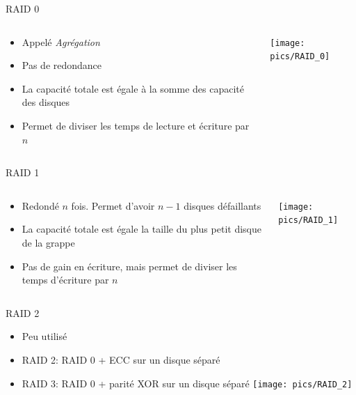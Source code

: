 \begin{frame}[fragile=singleslide]{RAID 0}
  \begin{columns}
    \begin{column}{6cm}
      \begin{itemize}
      \item Appelé \emph{Agrégation}
      \item Pas de redondance
      \item La capacité  totale est égale à la  somme des capacité des
        disques
      \item Permet de diviser les temps de lecture et écriture par $n$
      \end{itemize}
    \end{column}
    \begin{column}{4cm}
      \texttt{[image: pics/RAID\_0]}
    \end{column}
  \end{columns}
\end{frame}

\begin{frame}[fragile=singleslide]{RAID 1}
  \begin{columns}
    \begin{column}{6cm}
      \begin{itemize}
      \item Redondé $n$ fois. Permet d'avoir $n-1$ disques défaillants
      \item  La capacité  totale est  égale  la taille  du plus  petit
        disque de la grappe
      \item Pas de gain en  écriture, mais permet de diviser les temps
        d'écriture par $n$
      \end{itemize}
    \end{column}
    \begin{column}{4cm}
      \texttt{[image: pics/RAID\_1]}
    \end{column}
  \end{columns}
\end{frame}

\begin{frame}[fragile=singleslide]{RAID 2}
  \begin{itemize}
  \item Peu utilisé
  \item RAID 2: RAID 0 + ECC sur un disque séparé
  \item RAID 3: RAID 0 +  parité XOR  sur un disque séparé
    \texttt{[image: pics/RAID\_2]}
  \end{itemize}
\end{frame}

